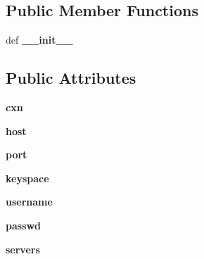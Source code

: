 \subsection*{Public Member Functions}
\begin{DoxyCompactItemize}
\item 
\hypertarget{classcheshire3_1_1grid_1_1cassandra_1_1_cassandra_c3_object_a2e0d2ea98f49d7f7894e9346cc21336f}{def {\bfseries \-\_\-\-\_\-init\-\_\-\-\_\-}}\label{classcheshire3_1_1grid_1_1cassandra_1_1_cassandra_c3_object_a2e0d2ea98f49d7f7894e9346cc21336f}

\end{DoxyCompactItemize}
\subsection*{Public Attributes}
\begin{DoxyCompactItemize}
\item 
\hypertarget{classcheshire3_1_1grid_1_1cassandra_1_1_cassandra_c3_object_afee8a90eeebdf4e892c4fd2f1a6a1637}{{\bfseries cxn}}\label{classcheshire3_1_1grid_1_1cassandra_1_1_cassandra_c3_object_afee8a90eeebdf4e892c4fd2f1a6a1637}

\item 
\hypertarget{classcheshire3_1_1grid_1_1cassandra_1_1_cassandra_c3_object_a4e001f07092bc7222ec72e620e4ef9fb}{{\bfseries host}}\label{classcheshire3_1_1grid_1_1cassandra_1_1_cassandra_c3_object_a4e001f07092bc7222ec72e620e4ef9fb}

\item 
\hypertarget{classcheshire3_1_1grid_1_1cassandra_1_1_cassandra_c3_object_a5ece5ef4459195a9462cb8aa13742e8e}{{\bfseries port}}\label{classcheshire3_1_1grid_1_1cassandra_1_1_cassandra_c3_object_a5ece5ef4459195a9462cb8aa13742e8e}

\item 
\hypertarget{classcheshire3_1_1grid_1_1cassandra_1_1_cassandra_c3_object_ac86bb31f94705ef5839f8c75c0878b8e}{{\bfseries keyspace}}\label{classcheshire3_1_1grid_1_1cassandra_1_1_cassandra_c3_object_ac86bb31f94705ef5839f8c75c0878b8e}

\item 
\hypertarget{classcheshire3_1_1grid_1_1cassandra_1_1_cassandra_c3_object_ae937e62555083f77a5dff0bf0bcdb30d}{{\bfseries username}}\label{classcheshire3_1_1grid_1_1cassandra_1_1_cassandra_c3_object_ae937e62555083f77a5dff0bf0bcdb30d}

\item 
\hypertarget{classcheshire3_1_1grid_1_1cassandra_1_1_cassandra_c3_object_a184d7b3ff33124b96fb6ac38ec2d6863}{{\bfseries passwd}}\label{classcheshire3_1_1grid_1_1cassandra_1_1_cassandra_c3_object_a184d7b3ff33124b96fb6ac38ec2d6863}

\item 
\hypertarget{classcheshire3_1_1grid_1_1cassandra_1_1_cassandra_c3_object_ad1507c7fcb29938a66672ea996185490}{{\bfseries servers}}\label{classcheshire3_1_1grid_1_1cassandra_1_1_cassandra_c3_object_ad1507c7fcb29938a66672ea996185490}

\end{DoxyCompactItemize}
